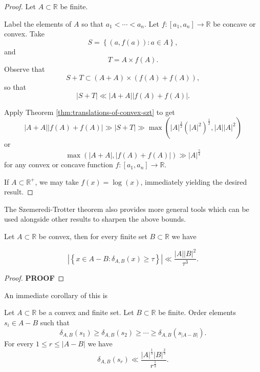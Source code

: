 \documentclass[12pt,reqno]{amsart}
\begin{document}
\begin{proof}
Let \(A \subset \mathbb{R} \) be finite. 

Label the elements of \(A\) so that \(a_1 < \cdots < a_{n} \).
Let \(f : [a_1,a_{n} ] \to \mathbb{R} \) be concave or convex.
Take
\[
    S = \left\{ (a,f(a)) : a \in A \right\} 
,\]
and
\[
    T = A \times f(A)
.\]
Observe that
\[
    S + T \subset \left( A + A \right) \times \left( f(A) + f(A) \right) 
,\]
so that
\[
    \left\lvert S + T \right\rvert \ll \left\lvert A + A \right\rvert \left\lvert f(A) + f(A) \right\rvert
.\]

Apply Theorem \ref{thm:translations-of-convex-szt} to get
\[
    \left\lvert A+A \right\rvert \left\lvert f(A) + f(A) \right\rvert \gg \left\lvert S+T \right\rvert \gg \max \left( \left\lvert A \right\rvert ^{\frac{3}{2} } \left( \left\lvert A \right\rvert ^{2} \right) ^{\frac{1}{2} }, \left\lvert A \right\rvert \left\lvert A \right\rvert ^{2} \right) 
\]
or
\[
    \max \left( \left\lvert A + A \right\rvert , \left\lvert f(A) + f(A) \right\rvert  \right) \gg \left\lvert A \right\rvert ^{\frac{5}{4} }
\]
for any convex or concave function \(f : [a_1,a_{n} ] \to \mathbb{R}\).

If \(A \subset \mathbb{R} ^{+}\), we may take \(f(x) = \log \left( x \right) \), immediately yielding the desired result.
\end{proof}

The Szemeredi-Trotter theorem also provides more general tools which can be
used alongside other results to sharpen the above bounds.

\begin{theorem}

    Let \(A \subset \mathbb{R} \) be convex, then for every 
    finite set \(B \subset \mathbb{R} \) we have

    \[
        \left\lvert \left\{ x \in A-B : \delta_{A,B} (x) \geq \tau \right\}  \right\rvert \ll \frac{\left\lvert A \right\rvert \left\lvert B \right\rvert^{2} }{\tau^{3} }
    .\]
\end{theorem}

\begin{proof}
\textbf{PROOF}
\end{proof}

An immediate corollary of this is

\begin{corollary}
Let \(A \subset \mathbb{R} \) be a convex and finite set. Let \(B \subset \mathbb{R} \) be finite.
Order elements \(s_{i} \in A-B\) such that 
\[
    \delta_{A,B} (s_1) \geq \delta_{A,B} (s_2) \geq \cdots \geq \delta_{A,B} (s _{\left\lvert A - B \right\rvert } )
.\]
For every \(1 \leq r \leq \left\lvert A - B \right\rvert\) we have
\[
    \delta_{A,B} (s _{r} ) \ll \frac{\left\lvert A \right\rvert^{\frac{1}{3} } \left\lvert B \right\rvert ^{\frac{2}{3} } }{r^{\frac{1}{3} }}
.\]
\end{corollary}
\end{document}

